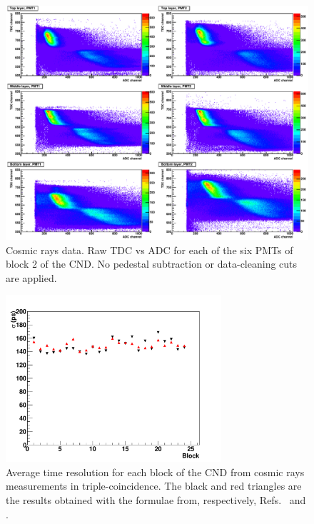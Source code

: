 \begin{figure}
\begin{center}
\includegraphics[width=140mm]{tdc_adc_raw.pdf}
\caption[Cosmic ray data for the CND]
{Cosmic rays data. Raw TDC vs ADC for each of the six PMTs of block 2 of the CND. No pedestal subtraction or data-cleaning cuts are applied.}
\label{tdc_adc_raw}
\end{center}
\end{figure}

\begin{figure}
\begin{center}
\includegraphics[width=80mm]{res_blocks.pdf}
\caption[Time resolution of the CND]
{Average time resolution for each block of the CND from cosmic rays measurements in triple-coincidence. The black and red triangles are the results obtained with the formulae from, respectively, Refs.~\cite{elton_paper} and \cite{vitali}.}
\label{res_blocks}
\end{center}
\end{figure}

